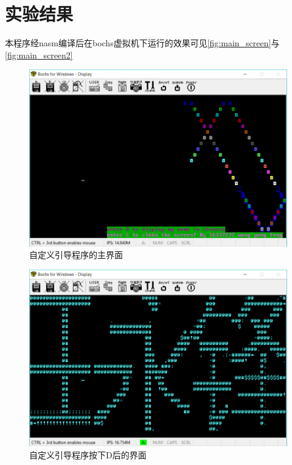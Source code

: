 \documentclass[forprint]{WHUBachelor}
\begin{document}
\chapter{实验结果}
本程序经nasm编译后在bochs虚拟机下运行的效果可见\autoref{fig:main_screen}与\autoref{fig:main_screen2}

\begin{figure}[htp]
  \centering
  \includegraphics[width=14cm]{"./figure/main_screen.png"}
  \caption{自定义引导程序的主界面}
  \label{fig:main_screen}
\end{figure}

\begin{figure}[htp]
  \centering
  \includegraphics[width=14cm]{"./figure/main_screen2.png"}
  \caption{自定义引导程序按下D后的界面}
  \label{fig:main_screen2}
\end{figure}
\end{document}
